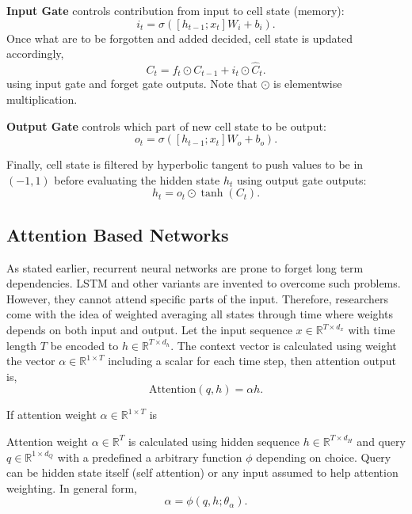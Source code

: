 \textbf{Input Gate} controls contribution from input to cell state (memory): 
\begin{equation}
\label{eqn:lstm_inp}
i_t = \sigma( [h_{t-1}; x_t] W_i + b_{i}).
\end{equation}
Once what are to be forgotten and added decided, cell state is updated accordingly, 
\begin{equation}
\label{eqn:lstm_cellstupt}
C_t = f_t \odot C_{t-1} + i_t \odot \hat{C}_t.
\end{equation}
using input gate and forget gate outputs. Note that $\odot$ is elementwise multiplication.

\textbf{Output Gate} controls which part of new cell state to be output: 
\begin{equation}
\label{eqn:lstm_out}
o_t = \sigma( [h_{t-1}; x_t] W_o + b_o).
\end{equation}

Finally, cell state is filtered by hyperbolic tangent to push values to be in $(-1,1)$ before evaluating the hidden state $h_t$ using output gate outputs: 
\begin{equation}
h_t = o_t \odot \tanh(C_t).
\end{equation}

\subsection{Attention Based Networks}

As stated earlier, recurrent neural networks are prone to forget long term dependencies. 
LSTM and other variants are invented to overcome such problems. 
However, they cannot attend specific parts of the input. 
Therefore, researchers come with the idea of weighted averaging all states through time where weights depends on both input and output. 
Let the input sequence $x \in \mathbb{R}^{T \times d_x}$ with time length $T$ be encoded to $h \in \mathbb{R}^{T \times d_h}$. 
The context vector is calculated using weight the vector $\alpha \in \mathbb{R}^{1 \times T}$ including a scalar for each time step, then attention output is, 
\begin{equation}
\mathrm{Attention}(q, h) = \alpha h. %
\label{eq:attention_generic}
\end{equation}

If attention weight $\alpha \in \mathbb{R}^{1 \times T}$ is  

Attention weight $\alpha \in \mathbb{R}^{T}$ is calculated using hidden sequence
$h \in \mathbb{R}^{T \times d_H}$ and query $q \in \mathbb{R}^{1 \times d_Q}$ with a predefined a arbitrary function $\phi$ depending on choice. 
Query can be hidden state itself (self attention) or any input assumed to help attention weighting. 
In general form,  
\begin{equation}
\alpha = \phi(q, h; \theta_{\alpha}).
\end{equation}

